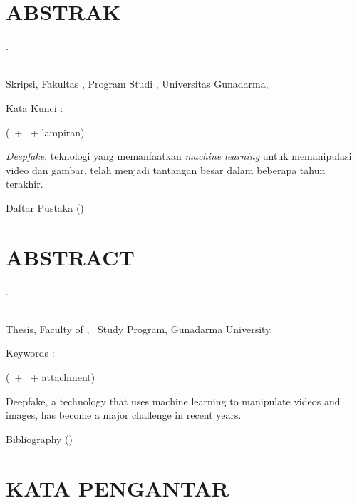 \documentclass[12pt,oneside,bahasa]{book}
\begin{document}
\chapter*{ABSTRAK}

\begin{singlespace}

\noindent\Penulis. \NPM

\noindent\MakeUppercase{\Judul} \\
Skripsi, Fakultas \Fakultas, Program Studi \Jurusan, Universitas
Gunadarma, \Tahun

\noindent Kata Kunci : \KataKunci

\medskip{}

\noindent (\JumlahHalamanDepan \ + \JumlahHalaman \ + lampiran)

\bigskip{}

\emph{Deepfake}, teknologi yang memanfaatkan \emph{machine learning}
untuk memanipulasi video dan gambar, telah menjadi tantangan besar
dalam beberapa tahun terakhir.

\bigskip{}

\noindent Daftar Pustaka (\TahunPustaka)
\end{singlespace}

\chapter*{ABSTRACT}

\begin{singlespace}

\noindent\Penulis. \NPM

\noindent\MakeUppercase{\JudulInggris} \\
Thesis, Faculty of \Faculty, \Major\ Study Program, Gunadarma University,
\Tahun

\noindent Keywords : \KeyWords

\medskip{}

\noindent (\JumlahHalamanDepan \ + \JumlahHalaman \ + attachment)

\bigskip{}

Deepfake, a technology that uses machine learning to manipulate videos
and images, has become a major challenge in recent years.

\bigskip{}

\noindent Bibliography (\TahunPustaka)
\end{singlespace}

\chapter*{KATA PENGANTAR}
\end{document}
